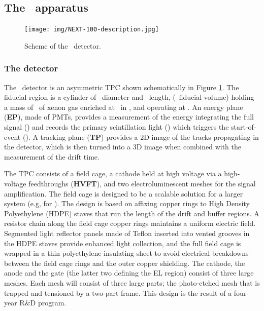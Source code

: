 \subsection{The \Next\ apparatus}
\label{sec.next100}

\begin{figure}[htbp!]
\centering
\texttt{[image: img/NEXT-100-description.jpg]}
\caption{\small Scheme of the \NEXT\ detector.}
\label{fig.next-100}
\end{figure}

\subsubsection{The detector}

The \Next\ detector is an asymmetric \HPXeEL TPC shown schematically in Figure \ref{fig.next-100}.  The fiducial region is a cylinder of \NextTpcDiameter\ diameter and \NextTpcLength\ length, (\NextFiducialVolume\ fiducial volume) holding a mass of \NextFiducialMass\ of xenon gas enriched at \XeEnrichment\ in \XE, and operating at \NextPressure.  An energy plane ({\bf EP}),
made of PMTs, provides a measurement of the energy integrating the full signal (\stwo) and records the primary scintillation light (\sone) which triggers the start-of-event (\tz). A tracking plane ({\bf TP}) provides a 2D image of the tracks propagating in the detector, which is then turned into a 3D image when combined with the measurement of the drift time.  

\indent

The TPC consists of a field cage, a cathode held at high voltage via a high-voltage feedthroughs ({\bf HVFT}), and two electroluminescent meshes for the signal amplification.
The field cage is designed to be a scalable solution for a larger system (e.g, for \NHD).  The design is based on affixing copper rings to High Density Polyethylene (HDPE) staves that run the length of the drift and buffer regions.  
A resistor chain along the field cage copper rings maintains a uniform electric field. Segmented light reflector panels made of Teflon inserted into vented grooves in the HDPE staves provide enhanced light collection, and the full field cage is wrapped in a thin polyethylene insulating sheet to avoid electrical breakdowns between the field cage rings and the outer copper shielding.
The cathode, the anode and the gate (the latter two defining the EL region) consist of three large meshes.  Each mesh will consist of three large parts; the photo-etched mesh that is trapped and tensioned by a two-part frame. This design is the result of a four-year R$\&$D program.

